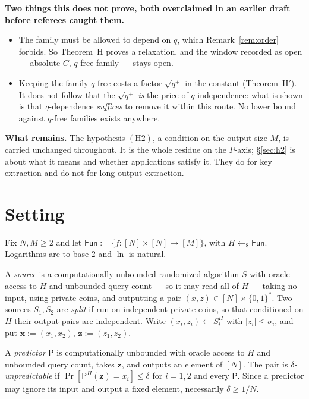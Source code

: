 \documentclass{aicr-solution}
\newcommand{\Fun}{\mathsf{Fun}}
\newcommand{\Prob}[1]{\Pr\!\left[#1\right]}
\newcommand{\bits}{\{0,1\}}
\newcommand{\vx}{\mathbf{x}}
\newcommand{\vz}{\mathbf{z}}
\begin{document}
\smallskip
\noindent\textbf{Two things this does not prove, both overclaimed in an earlier
draft before referees caught them.}

\begin{itemize}[leftmargin=1.2em,itemsep=2pt]
\item The family must be allowed to depend on $q$, which
  Remark~\ref{rem:order} forbids. So Theorem~H proves a relaxation, and the
  window recorded as open --- absolute $C$, $q$-free family --- stays open.
\item Keeping the family $q$-free costs a factor $\sqrt{q^{+}}$ in the constant
  (Theorem~H$'$). It does not follow that the $\sqrt{q^{+}}$ \emph{is} the price of
  $q$-independence: what is shown is that $q$-dependence \emph{suffices} to remove
  it within this route. No lower bound against $q$-free families exists anywhere.
\end{itemize}

\smallskip
\noindent\textbf{What remains.} The hypothesis $(\mathrm{H2})$, a condition on the
output size $M$, is carried unchanged throughout. It is the whole residue on the
$P$-axis; \S\ref{sec:h2} is about what it means and whether applications satisfy
it. They do for key extraction and do not for long-output extraction.

\section{Setting}\label{sec:setting}

Fix $N, M \ge 2$ and let $\Fun := \{f : [N] \times [N] \to [M]\}$, with
$H \gets_{\$} \Fun$. Logarithms are to base $2$ and $\ln$ is natural.

\begin{definition}\label{def:sources}
A \emph{source} is a computationally unbounded randomized algorithm $S$ with
oracle access to $H$ and unbounded query count --- so it may read all of $H$ ---
taking no input, using private coins, and outputting a pair
$(x,z) \in [N] \times \bits^{*}$. Two sources $S_1, S_2$ are \emph{split} if run
on independent private coins, so that conditioned on $H$ their output pairs are
independent. Write $(x_i,z_i) \gets S_i^{H}$ with $|z_i| \le \sigma_i$, and put
$\vx := (x_1,x_2)$, $\vz := (z_1,z_2)$.

A \emph{predictor} $\mathsf{P}$ is computationally unbounded with oracle access to
$H$ and unbounded query count, takes $\vz$, and outputs an element of $[N]$. The
pair is \emph{$\delta$-unpredictable} if
$\Prob{\mathsf{P}^{H}(\vz) = x_i} \le \delta$ for $i = 1,2$ and every $\mathsf{P}$.
Since a predictor may ignore its input and output a fixed element, necessarily
$\delta \ge 1/N$.
\end{definition}
\end{document}
